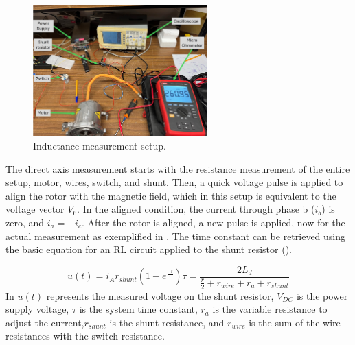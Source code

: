 \begin{figure}[!htb]
	\centering
	\includegraphics[width=0.6\textwidth]{Figures/induc_test.jpg}
	\caption[Inductance measurement setup.]{Inductance measurement setup.}
	\label{fig:induc_setup} %
\end{figure}

The direct axis measurement starts with the resistance measurement of the entire setup, motor, wires, switch, and shunt. Then, a quick voltage pulse is applied to align the rotor with the magnetic field, which in this setup is equivalent to the voltage vector $V_6$. In the aligned condition, the current through phase b ($i_b$) is zero, and $i_a = -i_c$. After the rotor is aligned, a new pulse is applied, now for the actual measurement as exemplified in . The time constant can be retrieved using the basic equation for an RL circuit applied to the shunt resistor ().

\begin{subequations}
	\begin{equation}
		u(t) = i_A r_{shunt}(1-e^{\frac{-t}{\tau}})
		\label{eq:rl_circuit}
	\end{equation}
	\begin{equation}
		\tau = \frac{2L_d}{\frac{r}{2}+r_{wire} + r_a + r_{shunt}}
		\label{eq:tau}
	\end{equation}
\end{subequations}
In  $u(t)$ represents the measured voltage on the shunt resistor, $V_{DC}$ is the power supply voltage, $\tau$ is the system time constant, $r_a$ is the variable resistance to adjust the current,$r_{shunt}$ is the shunt resistance, and $r_{wire}$ is the sum of the wire resistances with the switch resistance. 

